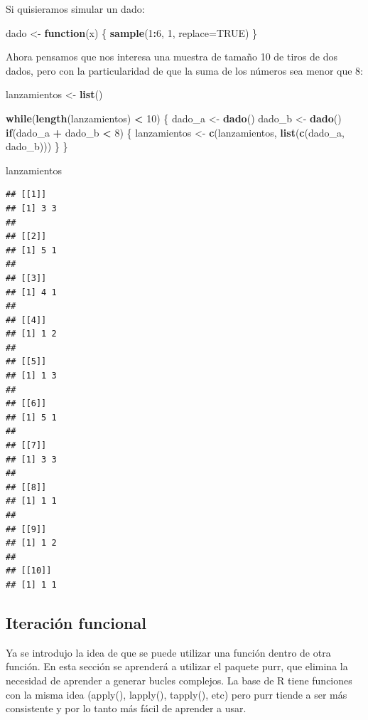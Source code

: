 \documentclass[]{book}
\newenvironment{Shaded}{\begin{snugshade}}{\end{snugshade}}
\newcommand{\KeywordTok}[1]{\textcolor[rgb]{0.13,0.29,0.53}{\textbf{#1}}}
\newcommand{\DataTypeTok}[1]{\textcolor[rgb]{0.13,0.29,0.53}{#1}}
\newcommand{\DecValTok}[1]{\textcolor[rgb]{0.00,0.00,0.81}{#1}}
\newcommand{\StringTok}[1]{\textcolor[rgb]{0.31,0.60,0.02}{#1}}
\newcommand{\OtherTok}[1]{\textcolor[rgb]{0.56,0.35,0.01}{#1}}
\newcommand{\ControlFlowTok}[1]{\textcolor[rgb]{0.13,0.29,0.53}{\textbf{#1}}}
\newcommand{\OperatorTok}[1]{\textcolor[rgb]{0.81,0.36,0.00}{\textbf{#1}}}
\newcommand{\NormalTok}[1]{#1}
\theoremstyle{definition}
\theoremstyle{definition}
\theoremstyle{definition}
\theoremstyle{remark}
\begin{document}
Si quisieramos simular un dado:

\begin{Shaded}
\begin{Highlighting}[]
\NormalTok{dado <-}\StringTok{ }\ControlFlowTok{function}\NormalTok{(x) \{}
  \KeywordTok{sample}\NormalTok{(}\DecValTok{1}\OperatorTok{:}\DecValTok{6}\NormalTok{, }\DecValTok{1}\NormalTok{, }\DataTypeTok{replace=}\OtherTok{TRUE}\NormalTok{)}
\NormalTok{\}}
\end{Highlighting}
\end{Shaded}

Ahora pensamos que nos interesa una muestra de tamaño 10 de tiros de dos
dados, pero con la particularidad de que la suma de los números sea
menor que 8:

\begin{Shaded}
\begin{Highlighting}[]
\NormalTok{lanzamientos <-}\StringTok{ }\KeywordTok{list}\NormalTok{()}

\ControlFlowTok{while}\NormalTok{(}\KeywordTok{length}\NormalTok{(lanzamientos) }\OperatorTok{<}\StringTok{ }\DecValTok{10}\NormalTok{) \{}
\NormalTok{  dado_a <-}\StringTok{ }\KeywordTok{dado}\NormalTok{()}
\NormalTok{  dado_b <-}\StringTok{ }\KeywordTok{dado}\NormalTok{()}
  \ControlFlowTok{if}\NormalTok{(dado_a }\OperatorTok{+}\StringTok{ }\NormalTok{dado_b }\OperatorTok{<}\StringTok{ }\DecValTok{8}\NormalTok{) \{}
\NormalTok{    lanzamientos <-}\StringTok{ }\KeywordTok{c}\NormalTok{(lanzamientos, }\KeywordTok{list}\NormalTok{(}\KeywordTok{c}\NormalTok{(dado_a, dado_b)))}
\NormalTok{  \}}
\NormalTok{\}}


\NormalTok{lanzamientos}
\end{Highlighting}
\end{Shaded}

\begin{verbatim}
## [[1]]
## [1] 3 3
## 
## [[2]]
## [1] 5 1
## 
## [[3]]
## [1] 4 1
## 
## [[4]]
## [1] 1 2
## 
## [[5]]
## [1] 1 3
## 
## [[6]]
## [1] 5 1
## 
## [[7]]
## [1] 3 3
## 
## [[8]]
## [1] 1 1
## 
## [[9]]
## [1] 1 2
## 
## [[10]]
## [1] 1 1
\end{verbatim}

\subsection{Iteración funcional}\label{iteracion-funcional}

Ya se introdujo la idea de que se puede utilizar una función dentro de
otra función. En esta sección se aprenderá a utilizar el paquete purr,
que elimina la necesidad de aprender a generar bucles complejos. La base
de R tiene funciones con la misma idea (apply(), lapply(), tapply(),
etc) pero purr tiende a ser más consistente y por lo tanto más fácil de
aprender a usar.
\end{document}
